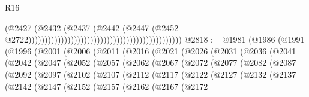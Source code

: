 \begin{lexlean}{R16}
\begin{coremodule}
                                                                                      (@2427
                                                                                        (@2432
                                                                                          (@2437
                                                                                            (@2442
                                                                                              (@2447
                                                                                                (@2452
                                                                                                  @2722)))))))))))))))))))))))))))))))))))))))))))))))
@2818 := @1981
    (@1986
      (@1991
        (@1996
          (@2001
            (@2006
              (@2011
                (@2016
                  (@2021
                    (@2026
                      (@2031
                        (@2036
                          (@2041
                            (@2042
                              (@2047
                                (@2052
                                  (@2057
                                    (@2062
                                      (@2067
                                        (@2072
                                          (@2077
                                            (@2082
                                              (@2087
                                                (@2092
                                                  (@2097
                                                    (@2102
                                                      (@2107
                                                        (@2112
                                                          (@2117
                                                            (@2122
                                                              (@2127
                                                                (@2132
                                                                  (@2137
                                                                    (@2142
                                                                      (@2147
                                                                        (@2152
                                                                          (@2157
                                                                            (@2162
                                                                              (@2167
                                                                                (@2172

\end{coremodule}
\end{lexlean}
